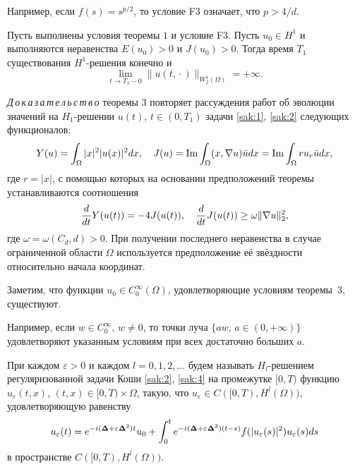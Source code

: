 \smallskip

Например, если $f(s)=s^{{p/2}}$, то условие {\sc F3} означает, что $p>{4/d}$.

\smallskip

\begin{theorem}[3]Пусть выполнены условия теоремы $1$ и условие {\sc F3.} 
Пусть $u_0\in H^1$ и выполняются неравенства $E(u_{0})>0$ и $J(u_0)>0.$ Тогда время $T_{1}$
существования $H^1$-решения конечно и $$\lim\limits_{t\to
T_{1}-0}\|u(t,{}\cdot {})\|_{W^{1}_{2}(\Omega )}=+\infty .$$
\end{theorem}

\smallskip

{\it Д\,о\,к\,а\,з\,а\,т\,е\,л\,ь\,с\,т\,в\,о\/ } теоремы 3 повторяет рассуждения работ \cite{Glassey, Zhidkov} об эволюции значений на $H_{1}$-решении $u(t)$, $ t\in (0,T_1)$ задачи \eqref{sak:1}, \eqref{sak:2} следующих
функционалов: $$Y(u)=\int_{\Omega }|x|^{2}|u(x)|^{2}dx, \quad  J(u)={\rm Im}\int_{\Omega }(x,\nabla u)\bar udx={\rm Im}\int_{\Omega }ru_r\bar udx,$$ где $r=|x|$, с помощью которых на основании предположений теоремы устанавливаются соотношения 
$${d\over {dt}}Y(u(t))=-4J(u(t)),\quad  {d\over {dt}}J(u(t))\geq \omega \| \nabla u\|^2_2,$$ где $\omega =\omega (C_d,d) >0$. При получении последнего неравенства в случае ограниченной области $\Omega $ используется предположение её звёздности относительно начала координат. 

Заметим, что функции $u_{0}\in C_{0}^{\infty }(\Omega )$, удовлетворяющие условиям теоремы~3, существуют.

Например, если $ w\in C_0^{\infty },\, w\neq 0$, то точки  луча \mbox{$\{ aw,\, a\in (0,+\infty )\}$} удовлетворяют указанным условиям при всех достаточно больших $a$.

\pagebreak

При каждом $\varepsilon >0$ и каждом $l=0, 1, 2, \dots$ будем называть $H_{l}$-решением
регуляризованной задачи Коши \eqref{sak:2}, \eqref{sak:4} 
на промежутке $[0,T )$ функцию
$u_{\varepsilon  }(t,x)$, $(t,x)\in [0,T)\times \Omega$, такую, что $u_{\varepsilon }\in C([0,T),H^{l}(\Omega ))$, удовлетворяющую равенству
\begin{equation}
u_{\varepsilon  }(t)=e^{-i({\bf \Delta } +\varepsilon {\bf \Delta }
^{2})t}u_{0}+\int_{0}^{t}e^{-i({\bf \Delta }+\varepsilon  {\bf \Delta }
^{2})(t-s)}f(|u_{\varepsilon }(s)|^2)u_{\varepsilon }(s)ds
\label{sak:8}
\end{equation}
в пространстве $C([0, T),H^{l}(\Omega ))$.

